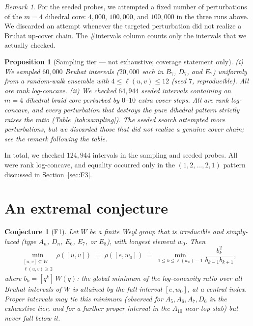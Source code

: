 \documentclass[11pt]{amsart}
\theoremstyle{plain}
\newtheorem{proposition}[theorem]{Proposition}
\newtheorem{conjecture}[theorem]{Conjecture}
\theoremstyle{definition}
\theoremstyle{remark}
\newtheorem{remark}[theorem]{Remark}
\newcommand{\W}{W}
\begin{document}
\begin{remark}
For the seeded probes, we attempted a fixed number of perturbations of the
$m=4$ dihedral core: $4{,}000$, $100{,}000$, and $100{,}000$ in the three
runs above. We discarded an attempt whenever the targeted perturbation did
not realize a Bruhat up-cover chain. The \#intervals column counts only the
intervals that we actually checked.
\end{remark}

\begin{proposition}[Sampling tier --- not exhaustive; coverage statement only]
\label{thm:V3}
\textup{(i)} We sampled $60{,}000$ Bruhat intervals ($20{,}000$ each in
$B_7$, $D_7$, and $E_7$) uniformly from a random-walk ensemble with
$4\le\ell(u,v)\le 12$ (seed $7$, reproducible). All are rank
log-concave. \textup{(ii)} We checked $64{,}944$ seeded intervals
containing an $m=4$ dihedral braid core perturbed by $0$--$10$ extra cover
steps. All are rank log-concave, and every perturbation that destroys the
pure dihedral pattern strictly raises the ratio
(Table~\ref{tab:sampling}). The seeded search attempted more
perturbations, but we discarded those that did not realize a genuine cover
chain; see the remark following the table.
\end{proposition}

In total, we checked $124{,}944$ intervals in the sampling and seeded
probes. All were rank log-concave, and equality occurred only in the
$(1,2,\dots,2,1)$ pattern discussed in Section~\ref{sec:F3}.

\section{An extremal conjecture}
\label{sec:F1}

\begin{conjecture}[F1]
\label{conj:F1}
Let $\W$ be a finite Weyl group that is \emph{irreducible} and
\emph{simply-laced} (type $A_n$, $D_n$, $E_6$, $E_7$, or $E_8$), with
longest element $w_0$. Then
\[
\min_{\substack{[u,v]\subseteq \W \\ \ell(u,v)\ge 2}} \rho([u,v])
\;=\; \rho([e,w_0])
\;=\; \min_{1\le k\le \ell(w_0)-1} \frac{b_k^2}{b_{k-1}b_{k+1}},
\]
where $b_k=[q^k]\,W(q)$: the global minimum of the log-concavity ratio over
\emph{all} Bruhat intervals of $\W$ is attained by the full interval
$[e,w_0]$, at a central index. Proper intervals may tie this minimum
(observed for $A_5,A_6,A_7,D_6$ in the exhaustive tier, and for a further
proper interval in the $A_{10}$ near-top slab) but never fall below it.
\end{conjecture}
\end{document}
